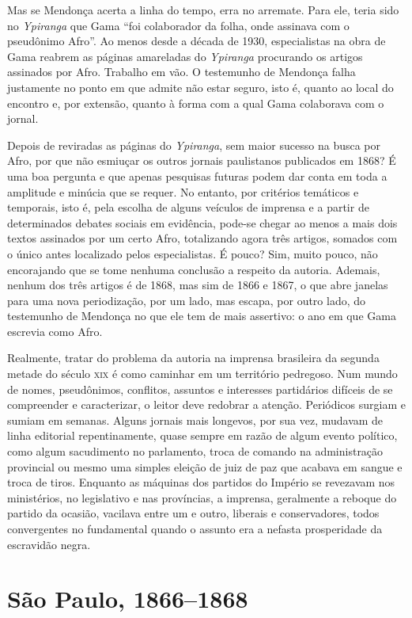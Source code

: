 Mas se Mendonça acerta a linha do tempo, erra no arremate. Para ele,
teria sido no \emph{Ypiranga} que Gama ``foi colaborador da folha, onde
assinava com o pseudônimo Afro''. Ao menos desde a década de 1930,
especialistas na obra de Gama reabrem as páginas amareladas do 
\emph{Ypiranga} procurando os artigos assinados por Afro. Trabalho 
em vão. O testemunho de Mendonça falha justamente no ponto em que admite
não estar seguro, isto é, quanto ao local do encontro e, por extensão,
quanto à forma com a qual Gama colaborava com o jornal.

Depois de reviradas as páginas do \emph{Ypiranga}, sem maior sucesso na
busca por Afro, por que não esmiuçar os outros jornais
paulistanos publicados em 1868? É uma boa pergunta e que apenas
pesquisas futuras podem dar conta em toda a amplitude e minúcia que se
requer. No entanto, por critérios temáticos e temporais, isto é, pela
escolha de alguns veículos de imprensa e a partir de determinados
debates sociais em evidência, pode-se chegar ao menos a mais dois textos
assinados por um certo Afro, totalizando agora três artigos,
somados com o único antes localizado pelos especialistas. É pouco? Sim,
muito pouco, não encorajando que se tome nenhuma conclusão a respeito da
autoria. Ademais, nenhum dos três artigos é de 1868, mas sim de 1866 e
1867, o que abre janelas para uma nova periodização, por um lado, mas
escapa, por outro lado, do testemunho de Mendonça no que ele tem de mais
assertivo: o ano em que Gama escrevia como Afro.

Realmente, tratar do problema da autoria na imprensa brasileira da
segunda metade do século \textsc{xix} é como caminhar em um território pedregoso.
Num mundo de nomes, pseudônimos, conflitos, assuntos e interesses
partidários difíceis de se compreender e caracterizar, o leitor deve
redobrar a atenção. Periódicos surgiam e sumiam em semanas. Alguns
jornais mais longevos, por sua vez, mudavam de linha editorial
repentinamente, quase sempre em razão de algum evento político, como
algum sacudimento no parlamento, troca de comando na administração
provincial ou mesmo uma simples eleição de juiz de paz que acabava em
sangue e troca de tiros. Enquanto as máquinas dos partidos do Império se
revezavam nos ministérios, no legislativo e nas províncias, a imprensa,
geralmente a reboque do partido da ocasião, vacilava entre um e outro,
liberais e conservadores, todos convergentes no fundamental quando o
assunto era a nefasta prosperidade da escravidão negra.

\section{São Paulo, 1866--1868}

